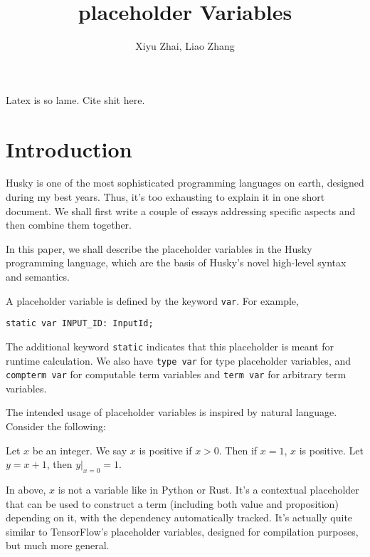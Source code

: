 \documentclass{article}
\title{placeholder Variables}
\author{Xiyu Zhai, Liao Zhang}
\date{}
\newcommand{\huskyinline}[1]{\lstinline[language=Husky]|#1|}
\begin{document}
\maketitle

Latex is so lame. Cite shit \cite{someAuthor2023}here.

\section{Introduction}

Husky is one of the most sophisticated programming languages on earth, designed during my best years. Thus, it's too exhausting to explain it in one short document. We shall first write a couple of essays addressing specific aspects and then combine them together.

In this paper, we shall describe the placeholder variables in the Husky programming language, which are the basis of Husky's novel high-level syntax and semantics.

A placeholder variable is defined by the keyword \huskyinline{var}. For example,
\begin{tcolorbox}[colback=gray!5,colframe=gray!50!black,title=Husky Code]
    \begin{lstlisting}[language=Husky]
static var INPUT_ID: InputId;
    \end{lstlisting}
\end{tcolorbox}

The additional keyword \huskyinline{static} indicates that this placeholder is meant for runtime calculation.
We also have \huskyinline{type var} for type placeholder variables, and \huskyinline{compterm var} for computable term variables and \huskyinline{term var} for arbitrary term variables.

The intended usage of placeholder variables is inspired by natural language. Consider the following:

\begin{tcolorbox}[colback=gray!5,colframe=gray!50!black,title=Example]
    Let $x$ be an integer. We say $x$ is positive if $x>0$. Then if $x=1$, $x$ is positive. Let $y=x+1$, then $y|_{x=0}=1$.
\end{tcolorbox}

In above, $x$ is not a variable like in Python or Rust. It's a contextual placeholder that can be used to construct a term (including both value and proposition) depending on it, with the dependency automatically tracked. It's actually quite similar to TensorFlow's placeholder variables, designed for compilation purposes, but much more general.
\end{document}
